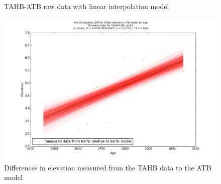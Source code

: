 \begin{figure}[h]
	\caption{TAHB-ATB raw data with linear interpolation model}
	\label{fig:data_TAHBxATB}
\end{figure}
\newpage

\begin{figure}[h]
	\includegraphics[width=0.9\linewidth]{data/gias/theGIA_TAHB_relative_to_ATB.png}
	\caption{Differences in elevation measured from the TAHB data to the ATB model}
	\label{fig:gias_TAHBxATB}
\end{figure}
\newpage


